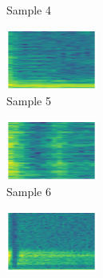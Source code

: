 \begin{figure}[H]
{\begin{subfigure}{0.23\textwidth}
{{        }\hspace*{0.75cm}%
      }%
      \caption*{Sample 4}
    \end{subfigure}
    \begin{subfigure}{0.23\textwidth}
      \includegraphics[width=3cm]{titletune/buttons/samples/tune13.mod-5.wav-spec.png}%
      \caption*{Sample 5}
    \end{subfigure}
    \begin{subfigure}{0.24\textwidth}
      \includegraphics[width=3cm]{titletune/buttons/samples/tune13.mod-6.wav-spec.png}%
      \caption*{Sample 6}
    \end{subfigure}
    \begin{subfigure}{0.24\textwidth}
      \includegraphics[width=3cm]{titletune/buttons/samples/tune13.mod-7.wav-spec.png}%
\end{subfigure}}
\end{figure}
